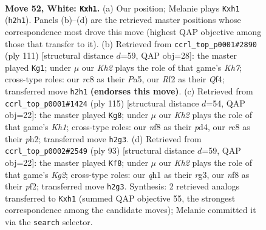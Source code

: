 \documentclass[11pt]{article}
\begin{document}
\clearpage

\begin{figure}[p]\centering
\begin{subfigure}{0.46\textwidth}\centering
\resizebox{\linewidth}{!}{%
\newchessgame
\chessboard[
  setfen={2r2nk1/1p2Q2p/8/5N1p/8/8/5R1K/7q w - - 0 52},
  showmover=false,
  pgfstyle=straightmove, color=movearrow, markmove={h2-h1}
]}
\caption{}
\end{subfigure}\hfill
\begin{subfigure}{0.46\textwidth}\centering
\resizebox{\linewidth}{!}{%
\newchessgame
\chessboard[
  setfen={8/8/8/p7/2N2q2/1P3r2/2P1Q2k/1K6 b - - 8 56},
  showmover=false,
  pgfstyle=straightmove, color=movearrow, markmove={h2-g1}
]}
\caption{}
\end{subfigure}
\\[4pt]
\begin{subfigure}{0.46\textwidth}\centering
\resizebox{\linewidth}{!}{%
\newchessgame
\chessboard[
  setfen={5r1k/1p6/8/5q2/3P3Q/4p3/7P/1R5K b - - 3 58},
  showmover=false,
  pgfstyle=straightmove, color=movearrow, markmove={h8-g8}
]}
\caption{}
\end{subfigure}\hfill
\begin{subfigure}{0.46\textwidth}\centering
\resizebox{\linewidth}{!}{%
\newchessgame
\chessboard[
  setfen={8/3r2k1/5n2/P3q3/8/6RP/5PP1/1Q4K1 b - - 2 47},
  showmover=false,
  pgfstyle=straightmove, color=movearrow, markmove={g7-f8}
]}
\caption{}
\end{subfigure}
\caption{\textbf{Move 52, White: \texttt{Kxh1}.} (a) Our position; Melanie plays \texttt{Kxh1} (\texttt{h2h1}). Panels (b)--(d) are the retrieved master positions whose correspondence most drove this move (highest QAP objective among those that transfer to it). (b) Retrieved from \texttt{ccrl\_top\_p0001\#2890} (ply 111) [structural distance $d$=59, QAP obj=28]: the master played \texttt{Kg1}; under $\mu$ our \emph{Kh2} plays the role of that game's \emph{Kh7}; cross-type roles: our \emph{r}c8 as their \emph{P}a5, our \emph{R}f2 as their \emph{Q}f4; transferred move \texttt{h2h1} \textbf{(endorses this move)}. (c) Retrieved from \texttt{ccrl\_top\_p0001\#1424} (ply 115) [structural distance $d$=54, QAP obj=22]: the master played \texttt{Kg8}; under $\mu$ our \emph{Kh2} plays the role of that game's \emph{Kh1}; cross-type roles: our \emph{n}f8 as their \emph{p}d4, our \emph{r}c8 as their \emph{p}h2; transferred move \texttt{h2g3}. (d) Retrieved from \texttt{ccrl\_top\_p0002\#2549} (ply 93) [structural distance $d$=59, QAP obj=22]: the master played \texttt{Kf8}; under $\mu$ our \emph{Kh2} plays the role of that game's \emph{Kg2}; cross-type roles: our \emph{q}h1 as their \emph{r}g3, our \emph{n}f8 as their \emph{p}f2; transferred move \texttt{h2g3}. Synthesis: 2 retrieved analogs transferred to \texttt{Kxh1} (summed QAP objective 55, the strongest correspondence among the candidate moves); Melanie committed it via the \texttt{search} selector.}
\label{fig:thought-m102}
\end{figure}
\end{document}
